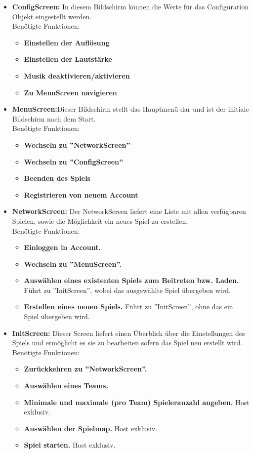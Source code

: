 \documentclass[fontsize=12pt,paper=a4,twoside]{scrartcl}
\begin{document}
\begin{itemize}
\item \textbf{ConfigScreen:} In diesem Bildschirm können die Werte für das Configuration Objekt eingestellt werden. \\ Benötigte Funktionen:
\begin{itemize}
\item \textbf{Einstellen der Auflösung}
\item \textbf{Einstellen der Lautstärke}
\item \textbf{Musik deaktivieren/aktivieren}
\item \textbf{Zu MenuScreen navigieren}
\end{itemize}

\item \textbf{MenuScreen:}Dieser Bildschirm stellt das Hauptmenü dar und ist der initiale Bildschirm nach dem Start. \\ Benötigte Funktionen:
\begin{itemize}
	\item \textbf{Wechseln zu ''NetworkScreen''}
	\item \textbf{Wechseln zu ''ConfigScreen''}
	\item \textbf{Beenden des Spiels}
	\item \textbf{Registrieren von neuem Account}
\end{itemize} 

\item \textbf{NetworkScreen:} Der NetworkScreen liefert eine Liste mit allen verfügbaren Spielen, sowie die Möglichkeit ein neues Spiel zu erstellen.\\ Benötigte Funktionen:
\begin{itemize}
	\item \textbf{Einloggen in Account.}
	\item \textbf{Wechseln zu ''MenuScreen''.}
	\item \textbf{Auswählen eines existenten Spiels zum Beitreten bzw. Laden.} Führt zu ''InitScreen'', wobei das ausgewählte Spiel übergeben wird.
	\item \textbf{Erstellen eines neuen Spiels.} Führt zu ''InitScreen'', ohne das ein Spiel übergeben wird.
\end{itemize}

\item \textbf{InitScreen:}
Dieser Screen liefert einen Überblick über die Einstellungen des Spiels und ermöglicht es sie zu bearbeiten sofern das Spiel neu erstellt wird.\\ Benötigte Funktionen:
\begin{itemize}
	\item \textbf{Zurückkehren zu ''NetworkScreen''.}
	\item \textbf{Auswählen eines Teams.}
	\item \textbf{Minimale und maximale (pro Team) Spieleranzahl angeben.} Host exklusiv.
	\item \textbf{Auswählen der Spielmap.} Host exklusiv.
	\item \textbf{Spiel starten.} Host exklusiv.
\end{itemize}


\end{itemize}
\end{document}
